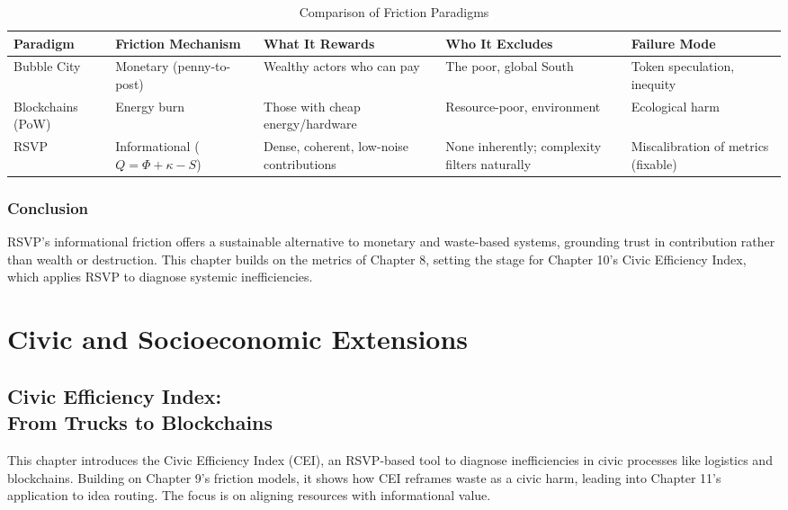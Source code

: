 \documentclass[openany]{book}
\begin{document}
\begin{table}[h]
\centering
\begin{tabular}{p{2cm} p{3cm} p{3cm} p{3cm} p{3cm}}
\textbf{Paradigm} & \textbf{Friction Mechanism} & \textbf{What It Rewards} & \textbf{Who It Excludes} & \textbf{Failure Mode} \\ \hline
Bubble City & Monetary (penny-to-post) & Wealthy actors who can pay & The poor, global South & Token speculation, inequity \\
Blockchains (PoW) & Energy burn & Those with cheap energy/hardware & Resource-poor, environment & Ecological harm \\
RSVP & Informational ($Q = \Phi + \kappa - S$) & Dense, coherent, low-noise contributions & None inherently; complexity filters naturally & Miscalibration of metrics (fixable) \\
\end{tabular}
\caption{Comparison of Friction Paradigms}
\label{tab:friction}
\end{table}

\section{Conclusion}

RSVP’s informational friction offers a sustainable alternative to monetary and waste-based systems, grounding trust in contribution rather than wealth or destruction. This chapter builds on the metrics of Chapter 8, setting the stage for Chapter 10’s Civic Efficiency Index, which applies RSVP to diagnose systemic inefficiencies.

\part{Civic and Socioeconomic Extensions}

\chapter{Civic Efficiency Index:\\ From Trucks to Blockchains}

This chapter introduces the Civic Efficiency Index (CEI), an RSVP-based tool to diagnose inefficiencies in civic processes like logistics and blockchains. Building on Chapter 9’s friction models, it shows how CEI reframes waste as a civic harm, leading into Chapter 11’s application to idea routing. The focus is on aligning resources with informational value.
\end{document}
